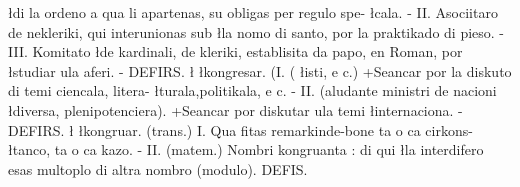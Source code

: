{\l{di la ordeno a qua li apartenas, su obligas per regulo spe-}
\l{cala. - II. Asociitaro de nekleriki, qui interunionas sub}
\l{la nomo di santo, por la praktikado di pieso. - III. Komitato}
\l{de kardinali, de kleriki, establisita da papo, en Roman, por}
\l{studiar ula aferi. - DEFIRS.}
\l{}
\l{kongresar. (I. (}
\l{isti, e c.) +Seancar por la diskuto di temi ciencala, litera-}
\l{turala,politikala, e c. - II. (aludante ministri de nacioni}
\l{diversa, plenipotenciera). +Seancar por diskutar ula temi}
\l{internaciona. - DEFIRS.}
\l{}
\l{kongruar. (trans.) I. Qua fitas remarkinde-bone ta o ca cirkons-}
\l{tanco, ta o ca kazo. - II. (matem.) Nombri kongruanta : di qui}
\l{la interdifero esas multoplo di altra nombro (modulo). DEFIS.}
}
